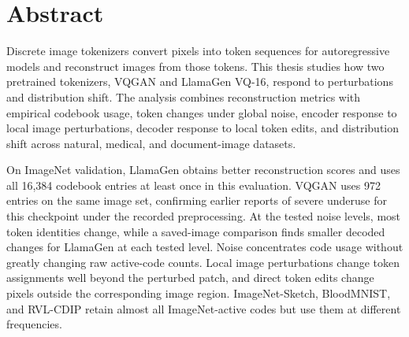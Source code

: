 \documentclass{Configuration_Files/PoliMi3i_thesis}
\begin{document}


\pagestyle{empty} %
\hypersetup{pageanchor=false}
\frontmatter %


\startpreamble
\setcounter{page}{1} %
\hypersetup{pageanchor=true}

\chapter*{Abstract} 
Discrete image tokenizers convert pixels into token sequences for autoregressive
models and reconstruct images from those tokens. This thesis studies how two
pretrained tokenizers, VQGAN and LlamaGen VQ-16, respond to perturbations and
distribution shift. The analysis combines
reconstruction metrics with empirical codebook usage, token changes under
global noise, encoder response to local image perturbations, decoder response
to local token edits, and distribution shift across natural, medical, and
document-image datasets.

On ImageNet validation, LlamaGen obtains better reconstruction scores and uses
all 16{,}384 codebook entries at least once in this evaluation. VQGAN uses 972
entries on the same image set, confirming earlier reports of severe underuse
for this checkpoint under the recorded preprocessing. At the tested noise
levels, most token identities change, while a saved-image comparison finds
smaller decoded changes for LlamaGen at each tested level. Noise concentrates
code usage without greatly changing raw active-code counts. Local image
perturbations change token assignments well beyond the perturbed patch, and
direct token edits change pixels outside the corresponding image region.
ImageNet-Sketch, BloodMNIST, and RVL-CDIP retain almost all ImageNet-active
codes but use them at different frequencies.
\end{document}
